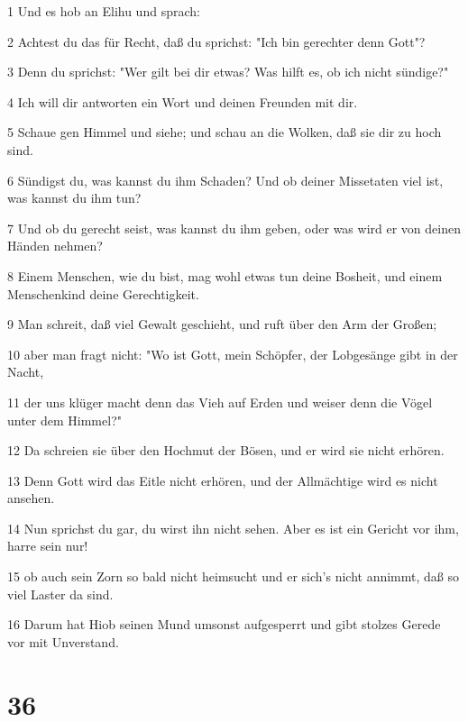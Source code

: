 \par 1 Und es hob an Elihu und sprach:
\par 2 Achtest du das für Recht, daß du sprichst: "Ich bin gerechter denn Gott"?
\par 3 Denn du sprichst: "Wer gilt bei dir etwas? Was hilft es, ob ich nicht sündige?"
\par 4 Ich will dir antworten ein Wort und deinen Freunden mit dir.
\par 5 Schaue gen Himmel und siehe; und schau an die Wolken, daß sie dir zu hoch sind.
\par 6 Sündigst du, was kannst du ihm Schaden? Und ob deiner Missetaten viel ist, was kannst du ihm tun?
\par 7 Und ob du gerecht seist, was kannst du ihm geben, oder was wird er von deinen Händen nehmen?
\par 8 Einem Menschen, wie du bist, mag wohl etwas tun deine Bosheit, und einem Menschenkind deine Gerechtigkeit.
\par 9 Man schreit, daß viel Gewalt geschieht, und ruft über den Arm der Großen;
\par 10 aber man fragt nicht: "Wo ist Gott, mein Schöpfer, der Lobgesänge gibt in der Nacht,
\par 11 der uns klüger macht denn das Vieh auf Erden und weiser denn die Vögel unter dem Himmel?"
\par 12 Da schreien sie über den Hochmut der Bösen, und er wird sie nicht erhören.
\par 13 Denn Gott wird das Eitle nicht erhören, und der Allmächtige wird es nicht ansehen.
\par 14 Nun sprichst du gar, du wirst ihn nicht sehen. Aber es ist ein Gericht vor ihm, harre sein nur!
\par 15 ob auch sein Zorn so bald nicht heimsucht und er sich's nicht annimmt, daß so viel Laster da sind.
\par 16 Darum hat Hiob seinen Mund umsonst aufgesperrt und gibt stolzes Gerede vor mit Unverstand.

\chapter{36}

